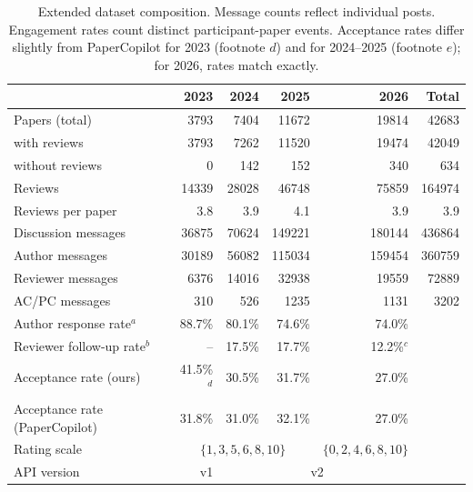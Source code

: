 \documentclass{article}
\begin{document}
\begin{table}[htbp]
  \centering
  \caption{Extended dataset composition. Message counts reflect individual posts. Engagement rates count distinct participant-paper events. Acceptance rates differ slightly from PaperCopilot for 2023 (footnote $d$) and for 2024--2025 (footnote $e$); for 2026, rates match exactly.}
  \label{tab:dataset-appendix}
  \small
  \begin{tabular}{lrrrrr}
    \toprule
    & \textbf{2023} & \textbf{2024} & \textbf{2025} & \textbf{2026} & \textbf{Total} \\
    \midrule
    Papers (total)                & \num{3793}  & \num{7404}  & \num{11672} & \num{19814} & \num{42683}  \\
    \quad with reviews            & \num{3793}  & \num{7262}  & \num{11520} & \num{19474} & \num{42049}  \\
    \quad without reviews         & 0           & 142         & 152         & 340         & 634          \\
    Reviews                       & \num{14339} & \num{28028} & \num{46748} & \num{75859} & \num{164974} \\
    Reviews per paper             & 3.8         & 3.9         & 4.1         & 3.9         & 3.9          \\
    \midrule
    Discussion messages           & \num{36875} & \num{70624} & \num{149221}& \num{180144}& \num{436864} \\
    \quad Author messages         & \num{30189} & \num{56082} & \num{115034}& \num{159454}& \num{360759} \\
    \quad Reviewer messages       & \num{6376}  & \num{14016} & \num{32938} & \num{19559} & \num{72889}  \\
    \quad AC/PC messages          & 310         & 526         & \num{1235}  & \num{1131}  & \num{3202}   \\
    Author response rate$^a$      & 88.7\%      & 80.1\%      & 74.6\%      & 74.0\%      &              \\
    Reviewer follow-up rate$^b$   & --          & 17.5\%      & 17.7\%      & 12.2\%$^c$  &              \\
    \midrule
    Acceptance rate (ours)        & 41.5\%$^d$  & 30.5\%      & 31.7\%      & 27.0\%      &              \\
    Acceptance rate (PaperCopilot)& 31.8\%      & 31.0\%      & 32.1\%      & 27.0\%      &              \\
    Rating scale                  & \multicolumn{3}{c}{$\{1, 3, 5, 6, 8, 10\}$} & $\{0, 2, 4, 6, 8, 10\}$ & \\
    API version                   & v1          & \multicolumn{3}{c}{v2} &              \\
    \bottomrule
  \end{tabular}
\end{table}
\end{document}
